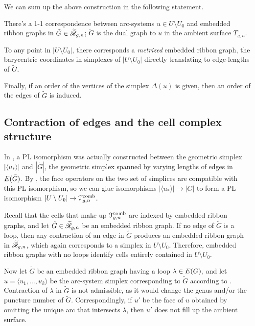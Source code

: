 We can sum up the above construction in the following statement.
\begin{lemma}
  \label{lemma:arcs-to-rg}
  There's a 1-1 correspondence between arc-systems $u \in U \setminus U_0$ and
  embedded ribbon graphs in $\tilde G \in \ERG[g,n]$; $\tilde G$ is the
  dual graph to $u$ in the ambient surface $T_{g,n}$.

  To any point in $|U \setminus U_0|$, there corresponds a \emph{metrized}
  embedded ribbon graph, the barycentric coordinates in simplexes of
  $|U \setminus U_0|$ directly translating to edge-lengths of $\tilde G$.

  Finally, if an order of the vertices of the simplex $\Delta(u)$ is given,
  then an order of the edges of $\tilde G$ is induced.
\end{lemma}


\subsection{Contraction of edges and the cell complex structure}
\label{sec:contractions-and-topology}

In , a PL isomorphism was actually constructed
between the geometric simplex $|\langle u_*\rangle|$ and $|\tilde G|$, the
geometric simplex spanned by varying lengths of edges in
$\Edges{\tilde G}$.  By , the face
operators on the two set of simplices are compatible with this PL
isomorphism, so we can glue isomorphisms $|\langle u_*\rangle| \to |G|$ to form a PL
isomorphism $|U \setminus U_0| \to \Tcomb_{g,n}$.

Recall that the cells that make up $\Tcomb_{g,n}$ are indexed by
embedded ribbon graphs, and let $\tilde G \in \ERG[g,n]$ be an embedded
ribbon graph. If no edge of $\tilde G$ is a loop, then any contraction
of an edge in $\tilde G$ produces an embedded ribbon graph in
$\ERG[g,n]$, which again corresponds to a simplex in $U \setminus U_0$.
Therefore, embedded ribbon graphs with no loops identify cells
entirely contained in $U \setminus U_0$. 

Now let $\tilde G$ be an embedded ribbon graph having a loop $\lambda \in
\Edges{G}$, and let $u = \langle u_1, \ldots, u_k\rangle$ be the arc-system simplex
corresponding to $\tilde G$ according to .
Contraction of $\lambda$ in $\tilde G$ is not admissible, as it would change
the genus and/or the puncture number of $\tilde G$.  Correspondingly,
if $u'$ be the face of $u$ obtained by omitting the unique arc
that intersects $\lambda$, then $u'$ does not fill up the ambient surface.

